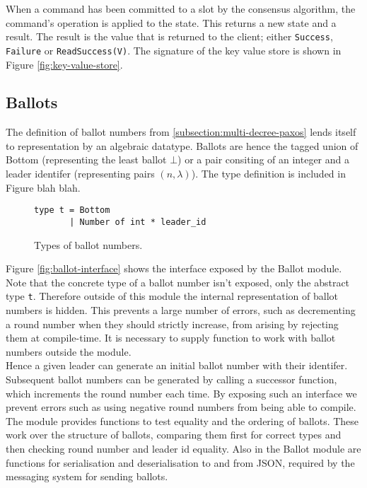 When a command has been committed to a slot by the consensus algorithm, the command's operation is applied to the state. This returns a new state and a result. The result is the value that is returned to the client; either \texttt{Success}, \texttt{Failure} or \texttt{ReadSuccess(V)}. The signature of the key value store is shown in Figure \ref{fig:key-value-store}.

\subsection{Ballots}

The definition of ballot numbers from \ref{subsection:multi-decree-paxos} lends itself to representation by an algebraic datatype. Ballots are hence the tagged union of Bottom (representing the least ballot $\bot$) or a pair consiting of an integer and a leader identifer (representing pairs $\left(n,\lambda\right)$). The type definition is included in {\color{red} Figure blah blah}. \\

\begin{figure}
  \begin{lstlisting}
type t = Bottom
       | Number of int * leader_id
  \end{lstlisting}
    \caption{Types of ballot numbers.}
  \centering
\end{figure}

Figure \ref{fig:ballot-interface} shows the interface exposed by the Ballot module. Note that the concrete type of a ballot number isn't exposed, only the abstract type \texttt{t}. Therefore outside of this module the internal representation of ballot numbers is hidden. This prevents a large number of errors, such as decrementing a round number when they should strictly increase, from arising by rejecting them at compile-time. It is necessary to supply function to work with ballot numbers outside the module. \\

Hence a given leader can generate an initial ballot number with their identifer. Subsequent ballot numbers can be generated by calling a successor function, which increments the round number each time. By exposing such an interface we prevent errors such as using negative round numbers from being able to compile. \\

The module provides functions to test equality and the ordering of ballots. These work over the structure of ballots, comparing them first for correct types and then checking round number and leader id equality. Also in the Ballot module are functions for serialisation and deserialisation to and from JSON, required by the messaging system for sending ballots.

